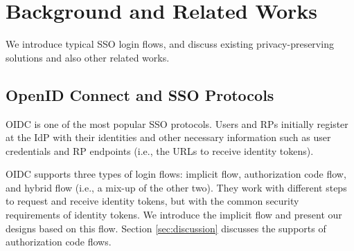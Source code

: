\section{Background and Related Works}
\label{sec:background}

We introduce %
  typical SSO login flows,
 and discuss existing privacy-preserving solutions and also other related works.

\subsection{OpenID Connect and SSO Protocols}
\label{subsec:OIDC}
OIDC is one of the most popular SSO protocols. %
Users and RPs initially register at the IdP with their identities %
and other necessary information such as user credentials %
 and RP endpoints (i.e., the URLs to receive identity tokens).

OIDC supports three types of login flows: implicit flow, authorization code flow, and hybrid flow (i.e., a mix-up of the other two).
They work with different steps to request and receive identity tokens,
    but with the common security requirements of identity tokens.
We introduce the implicit flow and present our designs based on this flow.
Section \ref{sec:discussion} discusses the supports of authorization code flows.

